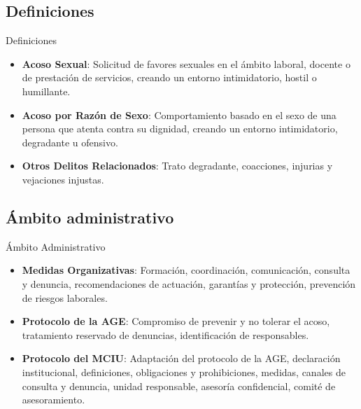 \documentclass{beamer}
\begin{document}
    \subsection{Definiciones}
    \begin{frame}{Definiciones}
        \begin{itemize}
            \item \textbf{Acoso Sexual}: Solicitud de favores sexuales en el ámbito laboral, docente o de prestación de servicios, creando un entorno intimidatorio, hostil o humillante.
            \item \textbf{Acoso por Razón de Sexo}: Comportamiento basado en el sexo de una persona que atenta contra su dignidad, creando un entorno intimidatorio, degradante u ofensivo.
            \item \textbf{Otros Delitos Relacionados}: Trato degradante, coacciones, injurias y vejaciones injustas.
        \end{itemize}
    \end{frame}

    \subsection{Ámbito administrativo}
    \begin{frame}{Ámbito Administrativo}
        \begin{itemize}
            \item \textbf{Medidas Organizativas}: Formación, coordinación, comunicación, consulta y denuncia, recomendaciones de actuación, garantías y protección, prevención de riesgos laborales.
            \item \textbf{Protocolo de la AGE}: Compromiso de prevenir y no tolerar el acoso, tratamiento reservado de denuncias, identificación de responsables.
            \item \textbf{Protocolo del MCIU}: Adaptación del protocolo de la AGE, declaración institucional, definiciones, obligaciones y prohibiciones, medidas, canales de consulta y denuncia, unidad responsable, asesoría confidencial, comité de asesoramiento.
        \end{itemize}
    \end{frame}
\end{document}

